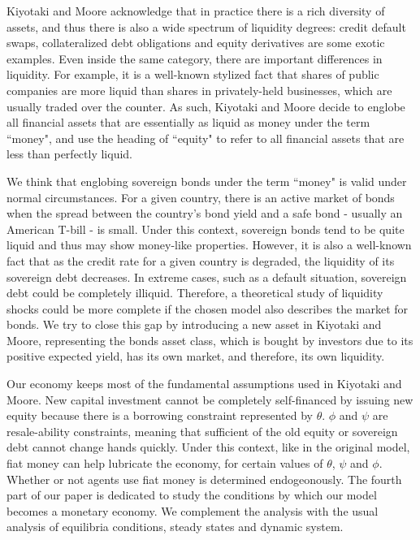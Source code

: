 \documentclass[12pt]{article}%
\begin{document}
Kiyotaki and Moore acknowledge that in practice there is a rich diversity of
assets, and thus there is also a wide spectrum of liquidity degrees: credit
default swaps, collateralized debt obligations and equity derivatives are some
exotic examples. Even inside the same category, there are important differences
in liquidity. For example, it is a well-known stylized fact that shares of
public companies are more liquid than shares in privately-held businesses, which
are usually traded over the counter. As such, Kiyotaki and Moore decide to
englobe all financial assets that are essentially as liquid as money under the
term ``money", and use the heading of ``equity" to refer to all financial assets
that are less than perfectly liquid.

We think that englobing sovereign bonds under the term ``money" is valid under
normal circumstances. For a given country, there is an active market of bonds
when the spread between the country's bond yield and a safe bond - usually an
American T-bill - is small. Under this context, sovereign bonds tend to be quite
liquid and thus may show money-like properties. However, it is also a well-known fact that
as the credit rate for a given country is degraded, the liquidity of its
sovereign debt decreases. In extreme cases, such as a default situation,
sovereign debt could be completely illiquid. Therefore, a theoretical study of liquidity shocks
could be more complete if the chosen model also describes the market for bonds.
We try to close this gap by introducing a new asset in Kiyotaki and Moore, representing the bonds asset class,
which is bought by investors due to its positive
expected yield, has its own market, and therefore, its own liquidity.

Our economy keeps most of the fundamental assumptions used in Kiyotaki and
Moore. New capital investment cannot be completely self-financed by issuing new equity because
there is a borrowing constraint represented by $\theta$. $\phi$ and $\psi$ are
resale-ability constraints, meaning that sufficient of the old equity or sovereign
debt cannot change hands quickly. Under this context, like in the original
model, fiat money can help lubricate the economy, for certain values of
$\theta$, $\psi$ and $\phi$. Whether or not agents use fiat money is determined
endogeonously. The fourth part of our paper is dedicated to study the conditions
by which our model becomes a monetary economy. We complement the analysis with
the usual analysis of equilibria conditions, steady states and dynamic system. 
\end{document}
